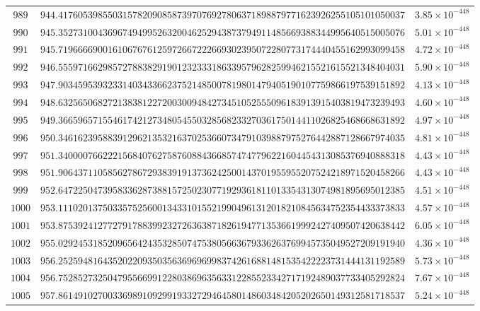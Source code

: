 \documentclass[12pt,reqno]{amsart}
\theoremstyle{remark}
\begin{document}
\begin{longtable}{clc}
$989$ & $944.4176053985503157820908587397076927806371898879771623926255105101050037$ & $3.85\times 10^{-448}$ \\
$990$ & $945.3527310043696749499526320046252943873794911485669388344995640515005076$ & $5.01\times 10^{-448}$ \\
$991$ & $945.7196666900161067676125972667222669302395072280773174440455162993099458$ & $4.72\times 10^{-448}$ \\
$992$ & $946.5559716629857278838291901232333186339579628259946215521615521348404031$ & $5.90\times 10^{-448}$ \\
$993$ & $947.9034595393233140343366237521485007819801479405190107759866197539151892$ & $4.13\times 10^{-448}$ \\
$994$ & $948.6325650682721383812272003009484273451052555096183913915403819473239493$ & $4.60\times 10^{-448}$ \\
$995$ & $949.3665965715546174212734805455032856823327036175014411026825468668631892$ & $4.97\times 10^{-448}$ \\
$996$ & $950.3461623958839129621353216370253660734791039887975276442887128667974035$ & $4.81\times 10^{-448}$ \\
$997$ & $951.3400007662221568407627587608843668574747796221604454313085376940888318$ & $4.43\times 10^{-448}$ \\
$998$ & $951.9064371105856278672938391913736242500143701955955207524218971520458266$ & $4.43\times 10^{-448}$ \\
$999$ & $952.6472250473958336287388157250230771929361811013354313074981895695012385$ & $4.51\times 10^{-448}$ \\
$1000$ & $953.1110201375033575256001343310155219904961312018210845634752354433373833$ & $4.57\times 10^{-448}$ \\
$1001$ & $953.8753924127727917883992327263638718261947713536619992427409507420638442$ & $6.05\times 10^{-448}$ \\
$1002$ & $955.0292453185209656424353285074753805663679336263769945735049527209191940$ & $4.36\times 10^{-448}$ \\
$1003$ & $956.2525948164352022093503563696969983742616881481535422223731444131192589$ & $5.73\times 10^{-448}$ \\
$1004$ & $956.7528527325047955669912280386963563312285523342717192489037733405292824$ & $7.67\times 10^{-448}$ \\
$1005$ & $957.8614910270033698910929919332729464580148603484205202650149312581718537$ & $5.24\times 10^{-448}$ \\

\end{longtable}
\end{document}
